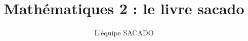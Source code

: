 





\title{Mathématiques 2  : le livre sacado}
\author{L'équipe SACADO}



\maketitle

%
%

%
%
%
%


